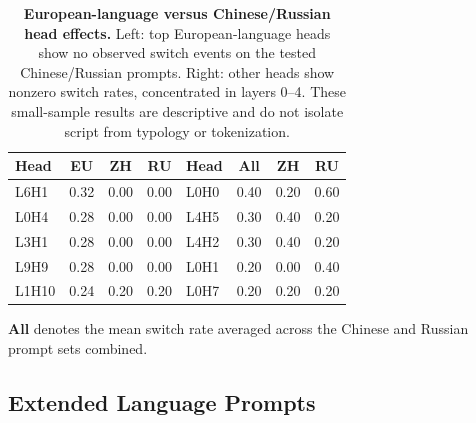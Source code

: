 \documentclass[11pt]{article}
\begin{document}
\begin{table}[H]
\caption{\textbf{European-language versus Chinese/Russian head effects.}
Left: top European-language heads show no observed switch events on the tested
Chinese/Russian prompts. Right: other heads show nonzero switch rates,
concentrated in layers 0--4. These small-sample results are descriptive and
do not isolate script from typology or tokenization.}
\label{tab:extended}
\centering\tiny
\begin{tabular}{lccc|lccc}
\toprule
\textbf{Head} & \textbf{EU} & \textbf{ZH} & \textbf{RU}
& \textbf{Head} & \textbf{All} & \textbf{ZH} & \textbf{RU} \\
\midrule
L6H1  & 0.32 & 0.00 & 0.00 & L0H0 & 0.40 & 0.20 & 0.60 \\
L0H4  & 0.28 & 0.00 & 0.00 & L4H5 & 0.30 & 0.40 & 0.20 \\
L3H1  & 0.28 & 0.00 & 0.00 & L4H2 & 0.30 & 0.40 & 0.20 \\
L9H9  & 0.28 & 0.00 & 0.00 & L0H1 & 0.20 & 0.00 & 0.40 \\
L1H10 & 0.24 & 0.20 & 0.20 & L0H7 & 0.20 & 0.20 & 0.20 \\
\bottomrule
\end{tabular}
\smallskip

{\footnotesize \textbf{All} denotes the mean switch rate averaged
across the Chinese and Russian prompt sets combined.}
\end{table}

\subsection{Extended Language Prompts}
\label{app:prompts}
\end{document}
